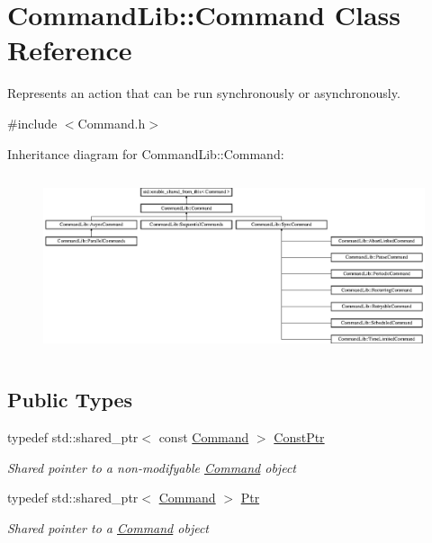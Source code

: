 \hypertarget{class_command_lib_1_1_command}{}\section{Command\+Lib\+:\+:Command Class Reference}
\label{class_command_lib_1_1_command}


Represents an action that can be run synchronously or asynchronously. 




{\ttfamily \#include $<$Command.\+h$>$}

Inheritance diagram for Command\+Lib\+:\+:Command\+:\begin{figure}[H]
\begin{center}
\leavevmode
\includegraphics[height=5.323195cm]{class_command_lib_1_1_command}
\end{center}
\end{figure}
\subsection*{Public Types}
\begin{DoxyCompactItemize}
\item 
typedef std\+::shared\+\_\+ptr$<$ const \mbox{\hyperlink{class_command_lib_1_1_command}{Command}} $>$ \mbox{\hyperlink{class_command_lib_1_1_command_aee8fd78ff853a1f9c8e56959c3e81811}{Const\+Ptr}}
\begin{DoxyCompactList}\small\item\em Shared pointer to a non-\/modifyable \mbox{\hyperlink{class_command_lib_1_1_command}{Command}} object\end{DoxyCompactList}\item 
typedef std\+::shared\+\_\+ptr$<$ \mbox{\hyperlink{class_command_lib_1_1_command}{Command}} $>$ \mbox{\hyperlink{class_command_lib_1_1_command_a3b3e4f00144373299df5c6bb1acc319d}{Ptr}}
\begin{DoxyCompactList}\small\item\em Shared pointer to a \mbox{\hyperlink{class_command_lib_1_1_command}{Command}} object\end{DoxyCompactList}\end{DoxyCompactItemize}

